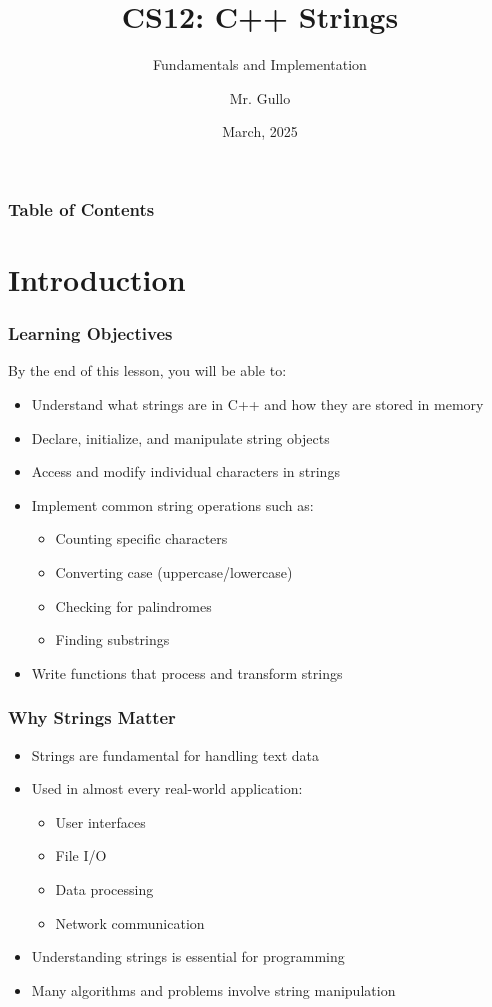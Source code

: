 \documentclass{beamer}
\title[C++ Strings]{CS12: C++ Strings}
\subtitle{Fundamentals and Implementation}
\author[Mr. Gullo]{Mr. Gullo}
\date[March 2025]{March, 2025}
\institute{Computer Science Department}
\begin{document}
\begin{frame}
    \titlepage
\end{frame}

\begin{frame}
    \frametitle{Table of Contents}
    \tableofcontents
\end{frame}

\section{Introduction}

\begin{frame}
    \frametitle{Learning Objectives}
    By the end of this lesson, you will be able to:
    \begin{itemize}
        \item Understand what strings are in C++ and how they are stored in memory
        \item Declare, initialize, and manipulate string objects
        \item Access and modify individual characters in strings
        \item Implement common string operations such as:
        \begin{itemize}
            \item Counting specific characters
            \item Converting case (uppercase/lowercase)
            \item Checking for palindromes
            \item Finding substrings
        \end{itemize}
        \item Write functions that process and transform strings
    \end{itemize}
\end{frame}

\begin{frame}
    \frametitle{Why Strings Matter}
    \begin{itemize}
        \item Strings are fundamental for handling text data
        \item Used in almost every real-world application:
        \begin{itemize}
            \item User interfaces
            \item File I/O
            \item Data processing
            \item Network communication
        \end{itemize}
        \item Understanding strings is essential for programming
        \item Many algorithms and problems involve string manipulation
    \end{itemize}
    
\end{frame}
\end{document}
